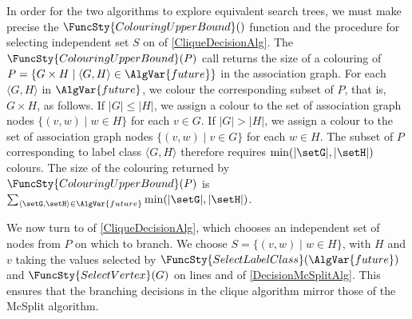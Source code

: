 In order for the two algorithms
to explore equivalent search trees, we must make precise
the $\FuncSty{ColouringUpperBound}()$ function and the procedure for selecting independent set $S$ on
 of \cref{CliqueDecisionAlg}.  The $\FuncSty{ColouringUpperBound}(P)$ call
returns the size of a colouring of $P = \{G \times H \mid \langle G,H \rangle \in \AlgVar{future}\}$
in the association graph.  For each $\langle G, H\rangle$ in $\AlgVar{future}$, we colour the corresponding
subset of $P$, that is, $G \times H$, as follows.  If $|G| \leq |H|$, we assign a colour to the set
of association graph nodes $\{(v,w) \mid w \in H\}$ for each $v \in G$.  If $|G| > |H|$, we assign
a colour to the set of association graph nodes $\{(v,w) \mid v \in G\}$ for each $w \in H$.
The subset of $P$ corresponding to label class $\langle G,H \rangle$ therefore requires
$\min(|\setG|,|\setH|)$ colours.
The size of the colouring returned by $\FuncSty{ColouringUpperBound}(P)$ is
$\sum_{\langle \setG,\setH \rangle \in \AlgVar{future}} \min(|\setG|,|\setH|)$.

We now turn to  of \cref{CliqueDecisionAlg}, which chooses an independent
set of nodes from $P$ on which to branch.  We choose $S = \{(v,w) \mid w \in H\}$, with $H$
and $v$ taking the values selected by $\FuncSty{SelectLabelClass}(\AlgVar{future})$
and $\FuncSty{SelectVertex}(G)$ on lines  and 
of \cref{DecisionMcSplitAlg}.  This ensures that the branching decisions in the clique algorithm
mirror those of the McSplit algorithm.

